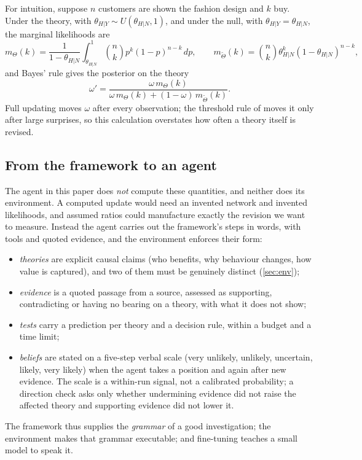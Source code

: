 \begin{remark}\label{rem:bayes}
For intuition, suppose $n$ customers are shown the fashion design and $k$ buy. Under the theory, with
$\theta_{H|Y}\sim U(\theta_{H|N},1)$, and under the null, with $\theta_{H|Y}=\theta_{H|N}$, the marginal likelihoods are
\begin{equation}
  m_\Theta(k) = \frac{1}{1-\theta_{H|N}}\int_{\theta_{H|N}}^{1}\binom{n}{k}p^k(1-p)^{n-k}\,dp,
  \qquad
  m_{\tilde\Theta}(k) = \binom{n}{k}\theta_{H|N}^k(1-\theta_{H|N})^{n-k},
\end{equation}
and Bayes' rule gives the posterior on the theory
\begin{equation}
  \omega' = \frac{\omega\, m_\Theta(k)}{\omega\, m_\Theta(k) + (1-\omega)\, m_{\tilde\Theta}(k)}.
\end{equation}
Full updating moves $\omega$ after every observation; the threshold rule of \citet{camuffo2024theory} moves it only after
large surprises, so this calculation overstates how often a theory itself is revised.
\end{remark}

\subsection{From the framework to an agent}
The agent in this paper does \emph{not} compute these quantities, and neither does its environment. A computed update would
need an invented network and invented likelihoods, and assumed ratios could manufacture exactly the revision we want to
measure. Instead the agent carries out the framework's steps in words, with tools and quoted evidence, and the environment
enforces their form:
\begin{itemize}
  \item \emph{theories} are explicit causal claims (who benefits, why behaviour changes, how value is captured), and two of
        them must be genuinely distinct (\cref{sec:env});
  \item \emph{evidence} is a quoted passage from a source, assessed as supporting, contradicting or having no bearing on a
        theory, with what it does not show;
  \item \emph{tests} carry a prediction per theory and a decision rule, within a budget and a time limit;
  \item \emph{beliefs} are stated on a five-step verbal scale (very unlikely, unlikely, uncertain, likely, very likely)
        when the agent takes a position and again after new evidence. The scale is a within-run signal, not a calibrated
        probability; a direction check asks only whether undermining evidence did not raise the affected theory and
        supporting evidence did not lower it.
\end{itemize}
The framework thus supplies the \emph{grammar} of a good investigation; the environment makes that grammar executable;
and fine-tuning teaches a small model to speak it.
